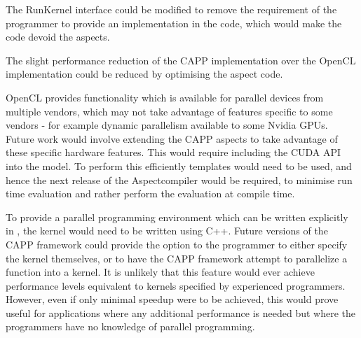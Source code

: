 \documentclass{sig-alternate-05-2015}
\begin{document}
The RunKernel interface could be modified to remove the requirement of the programmer to provide an
implementation in the \CPP code, which would make the \CPP code devoid the aspects.

The slight performance reduction of the CAPP implementation over the
OpenCL implementation could be reduced by optimising the aspect code.

OpenCL provides functionality which is available for parallel devices from
multiple vendors, which may not take advantage of features specific to some
vendors - for example dynamic parallelism available to some Nvidia GPUs.
Future work would involve extending the CAPP aspects to take advantage
of these specific hardware features. This would require including the CUDA API
into the model. To perform this efficiently templates would need to be used, and
hence the next release of the Aspect\CPP compiler would be required, to
minimise run time evaluation and rather perform the evaluation at compile time.

To provide a parallel programming environment which can be written explicitly in
\CPP, the kernel would need to be written using C++. Future versions of the
 CAPP framework could provide the option to the programmer to either specify
the kernel themselves, or to have the  CAPP framework attempt to
parallelize a \CPP function into a kernel. It is unlikely that this feature would
ever achieve performance levels equivalent to kernels specified by experienced
programmers. However, even if only minimal speedup were to be achieved, this would prove 
useful for applications where any additional performance is needed but where the
programmers have no knowledge of parallel programming. 

%

%
%
\end{document}
